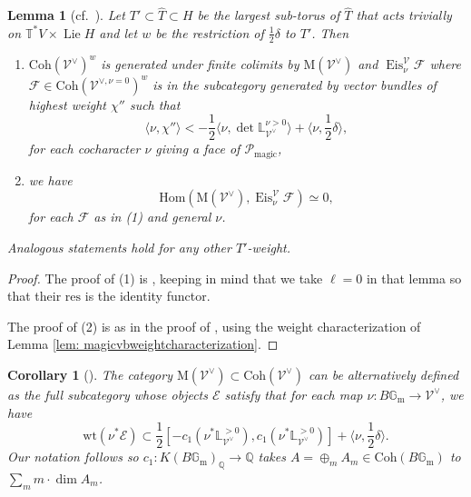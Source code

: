 \documentclass{amsart}
\newtheorem{lemma}[theorem]{Lemma}
\newtheorem{corollary}[theorem]{Corollary}
\theoremstyle{definition}
\theoremstyle{remark}
\numberwithin{equation}{section}
\DeclareMathOperator{\Lie}{Lie}
\newcommand{\mc}{\mathcal}
\newcommand{\Q}{\mathbb{Q}}
\newcommand{\Gm}{{\mathbb{G}_{\mathrm{m}}}}
\newcommand{\Hom}{\mathrm{Hom}}
\newcommand{\wh}{\widehat}
\newcommand{\res}{\mathrm{res}}
\DeclareMathOperator{\Eis}{\mathrm{Eis}}
\newcommand{\Coh}{\mathrm{Coh}}
\newcommand{\T}{\mathbb{T}}
\renewcommand{\L}{\mathbb{L}}
\newcommand{\wt}{\mathrm{wt}}
\newcommand{\magic}{\mathrm{magic}}
\newcommand{\M}{\mathrm{M}}
\begin{document}
\begin{lemma}[{cf.~\cite[Lemma 10.1]{PTDolbeault}}]{\label{lem: PT10.1lem}}
Let $T' \subset \wh T \subset H$ be the largest sub-torus of $\wh T$ that acts trivially on $\T^{\ast}V \times \Lie H$ and let $w$ be the restriction of $\frac{1}{2}\delta$ to $T'$. Then 
\begin{enumerate}
\item  $\Coh(\mc{V}^{\vee})^w$ is generated under finite colimits by $\M(\mc{V}^{\vee})$ and $\Eis^{\mc{V}}_{\nu} \mc{F}$ where $\mc{F} \in \Coh(\mc{V}^{\vee, \nu=0})^w$ is in the subcategory generated by vector bundles of highest weight $\chi''$ such that
\begin{equation*}
    \langle \nu, \chi'' \rangle < -\frac{1}{2} \langle \nu, \det \L^{\nu > 0}_{\mc{V}^{\vee}} \rangle + \langle \nu, \frac{1}{2}\delta \rangle,
\end{equation*}
for each cocharacter $\nu$ giving a face of $\mc{P}_{\magic}$,
\item  we have 
    \begin{equation*}
        \Hom(\M(\mc{V}^{\vee}), \Eis^{\mc{V}}_{\nu} \mc{F}) \simeq 0,
    \end{equation*}
    for each $\mc{F}$ as in (1) and general $\nu$.
\end{enumerate}
Analogous statements hold for any other $T'$-weight. 
\end{lemma}
\begin{proof}
The proof of (1) is \cite[Lemma 3.16]{PTqBPSsymquiverswithpotential}, keeping in mind that we take $\ell=0$ in that lemma so that their $\res$ is the identity functor. 

The proof of (2) is as in the proof of \cite[Proposition 3.22]{PTqBPSsymquiverswithpotential}, using the weight characterization of Lemma \ref{lem: magicvbweightcharacterization}. 
\end{proof}
\begin{corollary}[{\cite[Definition 3.12]{PTDolbeault}}]
The category $\M(\mc{V}^{\vee}) \subset \Coh(\mc{V}^{\vee})$ can be alternatively defined as the full subcategory whose objects $\mc{E}$ satisfy that for each map $\nu: B\Gm \rightarrow \mc{V}^{\vee}$, we have
\begin{equation*}
    \wt(\nu^{\ast} \mc{E}) \subset \frac{1}{2}\left[ - c_1(\nu^{\ast}\L^{>0}_{\mc{V}^{\vee}}) , c_1(\nu^{\ast}\L^{>0}_{\mc{V}^{\vee}})\right] + \langle \nu, \frac{1}{2}\delta \rangle.
\end{equation*}
Our notation follows \cite{PTDolbeault} so $c_1: K(B\Gm)_{\Q} \rightarrow \Q$ takes $A=\oplus_m A_m \in \Coh(B\Gm)$ to $\sum_m m \cdot \dim A_m$.
\end{corollary}
\end{document}
